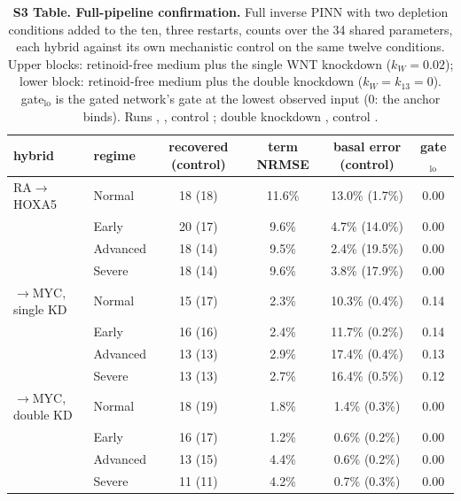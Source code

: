 \begin{table}[h]
\centering\footnotesize
\caption{\textbf{S3 Table. Full-pipeline confirmation.} Full inverse PINN with
two depletion conditions added to the ten, three restarts, counts over the 34
shared parameters, each hybrid against its own mechanistic control on the same
twelve conditions. Upper blocks: retinoid-free medium plus the single WNT
knockdown ($k_W=0.02$); lower block: retinoid-free medium plus the \bcat{}
double knockdown ($k_W=k_{13}=0$). gate$_{\text{lo}}$ is the gated network's
gate at the lowest observed input (0: the anchor binds). Runs
,
, control ;
double knockdown , control
.}
\label{tab:fullscale}
\begin{tabular}{llcccc}
\toprule
hybrid & regime & recovered (control) & term NRMSE & basal error (control) & gate$_{\text{lo}}$ \\
\midrule
RA$\to$HOXA5 & Normal & 18 (18) & 11.6\% & 13.0\% (1.7\%) & 0.00 \\
 & Early & 20 (17) & 9.6\% & 4.7\% (14.0\%) & 0.00 \\
 & Advanced & 18 (14) & 9.5\% & 2.4\% (19.5\%) & 0.00 \\
 & Severe & 18 (14) & 9.6\% & 3.8\% (17.9\%) & 0.00 \\
\bcat{}$\to$MYC, single KD & Normal & 15 (17) & 2.3\% & 10.3\% (0.4\%) & 0.14 \\
 & Early & 16 (16) & 2.4\% & 11.7\% (0.2\%) & 0.14 \\
 & Advanced & 13 (13) & 2.9\% & 17.4\% (0.4\%) & 0.13 \\
 & Severe & 13 (13) & 2.7\% & 16.4\% (0.5\%) & 0.12 \\
\midrule
\bcat{}$\to$MYC, double KD & Normal & 18 (19) & 1.8\% & 1.4\% (0.3\%) & 0.00 \\
 & Early & 16 (17) & 1.2\% & 0.6\% (0.2\%) & 0.00 \\
 & Advanced & 13 (15) & 4.4\% & 0.6\% (0.2\%) & 0.00 \\
 & Severe & 11 (11) & 4.2\% & 0.7\% (0.3\%) & 0.00 \\
\bottomrule
\end{tabular}
\end{table}

